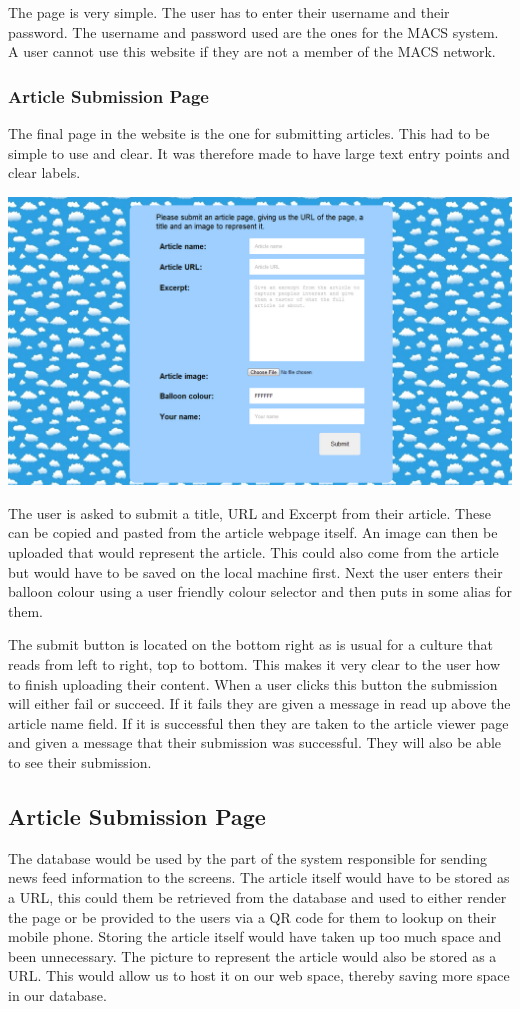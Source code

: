 The page is very simple. The user has to enter their username and their password. The username and password used are the ones for the MACS system. A user cannot use this website if they are not a member of the MACS network. 

\subsubsection{Article Submission Page}
The final page in the website is the one for submitting articles. This had to be simple to use and clear. It was therefore made to have large text entry points and clear labels.

\includegraphics[width=\textwidth]{Diagrams/Website-Submission}

The user is asked to submit a title, URL and Excerpt from their article. These can be copied and pasted from the article webpage itself. An image can then be uploaded that would represent the article. This could also come from the article but would have to be saved on the local machine first. Next the user enters their balloon colour using a user friendly colour selector and then puts in some alias for them. 

The submit button is located on the bottom right as is usual for a culture that reads from left to right, top to bottom. This makes it very clear to the user how to finish uploading their content. When a user clicks this button the submission will either fail or succeed. If it fails they are given a message in read up above the article name field. If it is successful then they are taken to the article viewer page and given a message that their submission was successful. They will also be able to see their submission.

\subsection{Article Submission Page}
The database would be used by the part of the system responsible for sending news feed information to the screens. The article itself would have to be stored as a URL, this could them be retrieved from the database and used to either render the page or be provided to the users via a QR code for them to lookup on their mobile phone. Storing the article itself would have taken up too much space and been unnecessary. The picture to represent the article would also be stored as a URL. This would allow us to host it on our web space, 
thereby saving more space in our database. 

